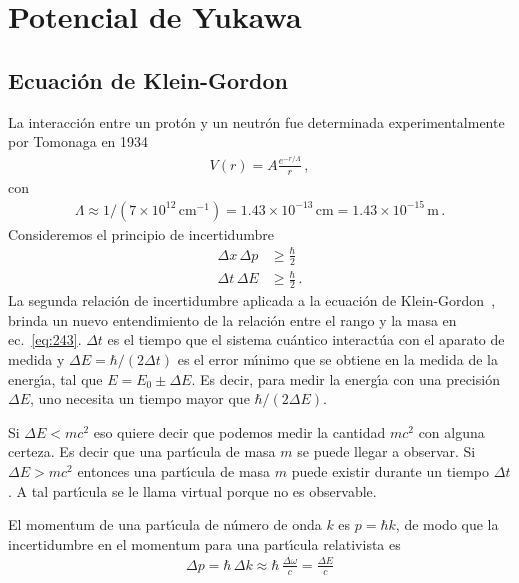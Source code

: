 \chapter{Potencial de Yukawa}


\section{Ecuaci\'on de Klein-Gordon}
\label{sec:ecuacion-de-klein}
La interacci\'on entre un prot\'on y un neutr\'on fue determinada experimentalmente por Tomonaga en 1934 \cite{history}
\begin{align}
\label{eq:243}
  V(r)={A}\frac{e^{-r/\Lambda }}{r}\,,
\end{align}
con
\begin{align}
  \label{eq:245}
  \Lambda\approx1/(7\times10^{12}\,\text{cm}^{-1})=1.43\times10^{-13}\,\text{cm}=1.43\times10^{-15}\,\text{m}\,.
\end{align}
Consideremos el principio de incertidumbre
\begin{align}
  \Delta x\, \Delta p &\geq \frac{\hbar}{2}\nonumber\\
\Delta t\, \Delta E&\geq\frac{\hbar}{2}\,.
\end{align}
La segunda relaci\'on de incertidumbre
aplicada a la ecuación de Klein-Gordon~\cite{Aitchison:2003tq}, brinda un nuevo entendimiento de la relaci\'on entre el rango y la masa en ec.~\eqref{eq:243}. $\Delta t$ es el tiempo que el sistema cu\'antico interact\'ua con el aparato de medida y $\Delta E=\hbar/(2\Delta t)$ es el error m\'\i nimo que se obtiene en la medida de la energ\'\i a, tal que $E=E_0\pm\Delta E$. Es decir, para medir la energ\'\i a con una precisi\'on $\Delta E$, uno necesita un tiempo mayor que $\hbar/(2\Delta E)$.

Si $\Delta E< mc^2$ eso quiere decir que podemos medir la cantidad $mc^2$ con alguna certeza. Es decir que una part\'\i cula de masa $m$ se puede llegar a observar. Si $\Delta E>mc^2$ entonces una part\'\i cula de masa $m$ puede existir durante un tiempo $\Delta t$. A tal part\'\i cula se le llama virtual porque no es observable. 

El momentum de una part\'\i cula de n\'umero de onda $k$ es $p=\hbar k$, de modo que la incertidumbre en el momentum para una part\'\i cula relativista es
\begin{align}
  \Delta p=\hbar\, \Delta k \approx\hbar\, \frac{\Delta\omega}{c}=\frac{\Delta E}{c}
\end{align}

